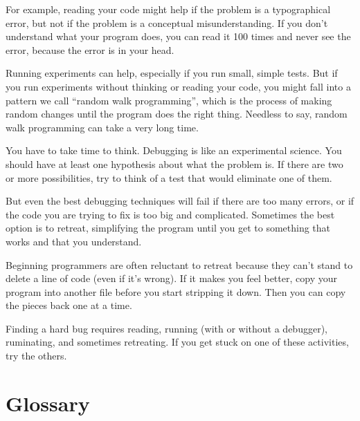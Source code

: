 For example, reading your code might help if the problem is a
typographical error, but not if the problem is a conceptual
misunderstanding.  If you don't understand what your program does, you
can read it 100 times and never see the error, because the error is in
your head.

Running experiments can help, especially if you run small, simple
tests.  But if you run experiments without thinking or reading your
code, you might fall into a pattern we call ``random walk programming'',
which is the process of making random changes until the program
does the right thing.  Needless to say, random walk programming
can take a very long time.

You have to take time to think.  Debugging is like an
experimental science.  You should have at least one hypothesis about
what the problem is.  If there are two or more possibilities, try to
think of a test that would eliminate one of them.

But even the best debugging techniques will fail if there are too many
errors, or if the code you are trying to fix is too big and
complicated.  Sometimes the best option is to retreat, simplifying the
program until you get to something that works and that you
understand.

Beginning programmers are often reluctant to retreat because
they can't stand to delete a line of code (even if it's wrong).
If it makes you feel better, copy your program into another file
before you start stripping it down.  Then you can copy the pieces
back one at a time.

Finding a hard bug requires reading, running (with or without 
a debugger), ruminating, and sometimes retreating.  If you get 
stuck on one of these activities, try the others.


\section{Glossary}

